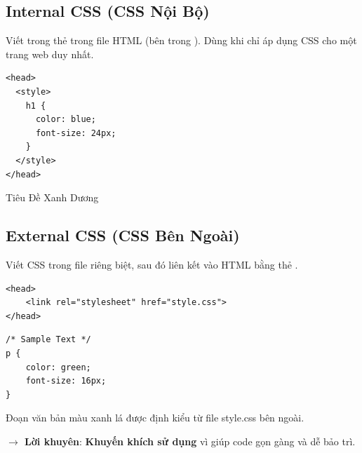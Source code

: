 \subsection{Internal CSS (CSS Nội Bộ)}
Viết trong thẻ  trong file HTML (bên trong ). Dùng khi chỉ áp dụng CSS cho một trang web duy nhất.
\begin{codeWindow}
\begin{lstlisting}[language=HTML5]
<head>
  <style>
    h1 {
      color: blue;
      font-size: 24px;
    }
  </style>
</head>
\end{lstlisting}
\end{codeWindow}

\begin{browserWindow}
\sffamily\small
\textcolor{primaryBlue}{\Large Tiêu Đề Xanh Dương}
\end{browserWindow}

\subsection{External CSS (CSS Bên Ngoài)}
Viết CSS trong file  riêng biệt, sau đó liên kết vào HTML bằng thẻ .
\begin{codeWindow}
\begin{lstlisting}[language=HTML5]
<head>
    <link rel="stylesheet" href="style.css">
</head>
\end{lstlisting}
\end{codeWindow}

\begin{codeWindow}
\begin{lstlisting}[language=CSS3]
/* Sample Text */
p {
    color: green;
    font-size: 16px;
}
\end{lstlisting}
\end{codeWindow}

\begin{browserWindow}
\sffamily\small
\textcolor{tipBorder}{Đoạn văn bản màu xanh lá được định kiểu từ file style.css bên ngoài.}
\end{browserWindow}
\textcolor{tipBorder}{\textbf{$\rightarrow$ Lời khuyên}}: \textcolor{primaryBlue}{\textbf{Khuyến khích sử dụng}} vì giúp code gọn gàng và dễ bảo trì.

